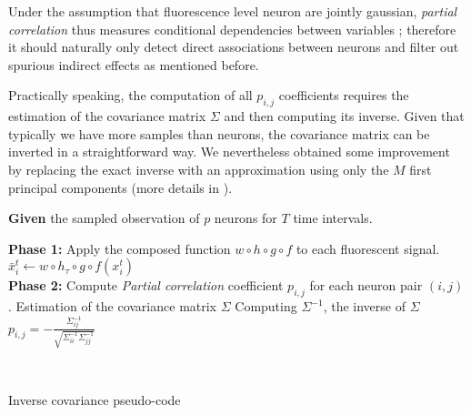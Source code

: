 \documentclass[wcp]{jmlr}
\begin{document}
Under the assumption that fluorescence level neuron are jointly gaussian, \textit{partial correlation} thus measures conditional dependencies between variables ; therefore it should naturally only detect direct associations between neurons and filter out spurious indirect effects as mentioned before.

Practically speaking, the computation of all $p_{i,j}$ coefficients requires the estimation of the covariance matrix $\Sigma$
and then computing its inverse. Given that typically we have more
samples than neurons, the covariance matrix can be inverted in a
straightforward way. We nevertheless obtained some improvement by
replacing the exact inverse with an approximation using only the $M$
first principal components \citep{bishop2006pattern} (more details in \citep{sutera2014simple}). 

\begin{table}[ht]
\begin{algorithmic}

\STATE \textbf{Given} the sampled observation of $p$ neurons for $T$ time intervals.\\[2ex]


\STATE \vspace{1em} \textbf{Phase 1:} Apply the composed function $w \circ h \circ g \circ f$ to each fluorescent signal.
\STATE $\bar{x}^t_i  \leftarrow w \circ h_{\tau} \circ g \circ f (x^t_i)$
\ENDFOR\\[2ex]

\STATE \textbf{Phase 2:} Compute \textit{Partial correlation} coefficient $p_{i,j}$ for each neuron pair $(i,j)$.
\STATE Estimation of the covariance matrix $\Sigma$
\STATE Computing $\Sigma^{-1}$, the inverse of $\Sigma$
\STATE $p_{i,j} =
-\frac{\Sigma^{-1}_{ij}}{\sqrt{\Sigma^{-1}_{ii} \Sigma^{-1}_{jj}}}$

\ENDFOR\\[2ex]
\ENDFOR

\end{algorithmic}
\caption{Inverse covariance pseudo-code}
\label{alg:inverse-covariance-pseudocode}
\end{table}





\end{document}
